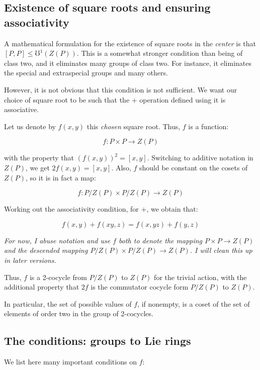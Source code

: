 \documentclass[10pt]{amsart}
\begin{document}
\subsection{Existence of square roots and ensuring associativity}

A mathematical formulation for the existence of square roots in the
{\em center} is that $[P,P] \le \mho^1(Z(P))$. This is a somewhat
stronger condition than being of class two, and it eliminates many
groups of class two. For instance, it eliminates the special and
extraspecial groups and many others.

However, it is not obvious that this condition is not sufficient. We
want our choice of square root to be such that the $+$ operation
defined using it is associative.

Let us denote by $f(x,y)$ this {\em chosen} square root. Thus, $f$ is a
function:

$$f:P \times P \to Z(P)$$

with the property that $(f(x,y))^2 =[x,y]$. Switching to additive
notation in $Z(P)$, we get $2f(x,y) = [x,y]$. Also, $f$ should be
constant on the cosets of $Z(P)$, so it is in fact a map:

$$f:P/Z(P) \times P/Z(P) \to Z(P)$$

Working out the associativity condition, for $+$, we obtain that:

$$f(x,y) + f(xy,z) = f(x,yz) + f(y,z)$$

{\em For now, I abuse notation and use $f$ both to denote the mapping
$P \times P \to Z(P)$ and the descended mapping $P/Z(P) \times P/Z(P)
\to Z(P)$. I will clean this up in later versions.}

Thus, $f$ is a 2-cocycle from $P/Z(P)$ to $Z(P)$ for the trivial action,
with the additional property that $2f$ is the commutator cocycle form
$P/Z(P)$ to $Z(P)$.

In particular, the set of possible values of $f$, if nonempty, is a
coset of the set of elements of order two in the group of 2-cocycles.

\subsection{The conditions: groups to Lie rings}

We list here many important conditions on $f$:
\end{document}
